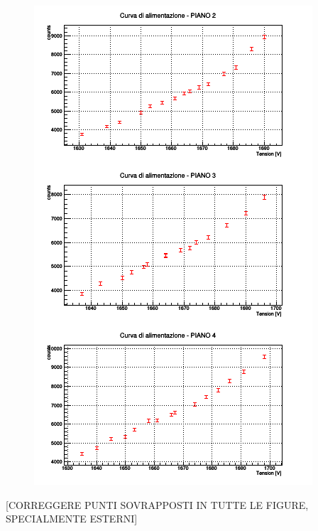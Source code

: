 \documentclass[11pt]{article}
\begin{document}
\begin{figure}
\includegraphics{"plateau_1"}
\end{figure}
[CORREGGERE PUNTI SOVRAPPOSTI IN TUTTE LE FIGURE, SPECIALMENTE ESTERNI]
\end{document}
